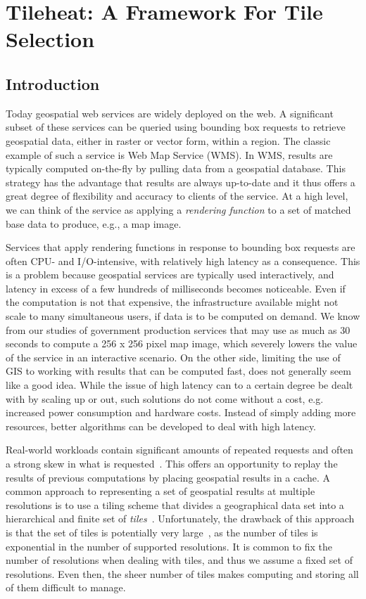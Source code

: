 \documentclass[11pt, oneside]{report}
\begin{document}
\chapter{Tileheat: A Framework For Tile Selection}
\label{chapter:tileheat}
\section{Introduction}

Today geospatial web services are widely deployed on the web. A significant subset of these services can be queried using bounding box requests to retrieve geospatial data, either in raster or vector form, within a region. The classic example of such a service is Web Map Service (WMS). In WMS, results are typically computed on-the-fly by pulling data from a geospatial database. This strategy has the advantage that results are always up-to-date and it thus offers a great degree of flexibility and accuracy to clients of the service. At a high level, we can think of the service as applying a \emph{rendering function} to a set of matched base data to produce, e.g., a map image.

Services that apply rendering functions in response to bounding box requests are often CPU- and I/O-intensive, with relatively high latency as a consequence. This is a problem because geospatial services are typically used interactively, and latency in excess of a few hundreds of milliseconds becomes noticeable. Even if the computation is not that expensive, the infrastructure available might not scale to many simultaneous users, if data is to be computed on demand. We know from our studies of government production services that may use as much as 30 seconds to compute a 256 x 256 pixel map image, which severely lowers the value of the service in an interactive scenario. On the other side, limiting the use of GIS to working with results that can be computed fast, does not generally seem like a good idea. While the issue of high latency can to a certain degree be dealt with by scaling up or out, such solutions do not come without a cost, e.g. increased power consumption and hardware costs. Instead of simply adding more resources, better algorithms can be developed to deal with high latency.

Real-world workloads contain significant amounts of repeated requests and often a strong skew in what is requested~\cite{fisher07,talagala00}. This offers an opportunity to replay the results of previous computations by placing geospatial results in a cache. A common approach to representing a set of geospatial results at multiple resolutions is to use a tiling scheme that divides a geographical data set into a hierarchical and finite set of \emph{tiles}~\cite{decola93}. Unfortunately, the drawback of this approach is that the set of tiles is potentially very large~\cite{garcia11}, as the number of tiles is exponential in the number of supported resolutions. It is common to fix the number of resolutions when dealing with tiles, and thus we assume a fixed set of resolutions. Even then, the sheer number of tiles makes computing and storing all of them difficult to manage.
\end{document}
